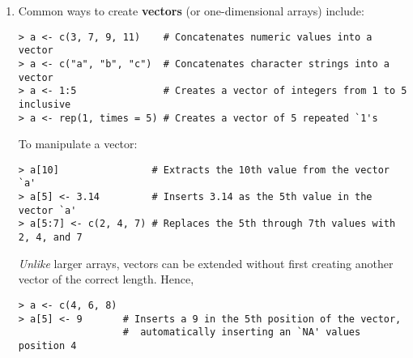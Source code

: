 \begin{enumerate}
\item Common ways to create {\bf vectors} (or one-dimensional arrays)
include:  
\begin{verbatim}
> a <- c(3, 7, 9, 11)    # Concatenates numeric values into a vector
> a <- c("a", "b", "c")  # Concatenates character strings into a vector
> a <- 1:5               # Creates a vector of integers from 1 to 5 inclusive  
> a <- rep(1, times = 5) # Creates a vector of 5 repeated `1's
\end{verbatim}
To manipulate a vector:  
\begin{verbatim}
> a[10]                # Extracts the 10th value from the vector `a'
> a[5] <- 3.14         # Inserts 3.14 as the 5th value in the vector `a'
> a[5:7] <- c(2, 4, 7) # Replaces the 5th through 7th values with 2, 4, and 7
\end{verbatim}
\emph{Unlike} larger arrays, vectors can be extended without first
creating another vector of the correct length.  Hence, 
\begin{verbatim}
> a <- c(4, 6, 8) 
> a[5] <- 9       # Inserts a 9 in the 5th position of the vector,
                  #  automatically inserting an `NA' values position 4 
\end{verbatim}


\end{enumerate}
